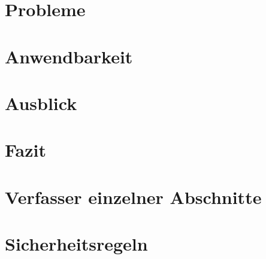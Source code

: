 \documentclass[11pt,a4paper]{article}
\begin{document}
\clearpage
\section{Probleme}
\label{sec:probleme}



\clearpage
\section{Anwendbarkeit}
\label{sec:anwendbarkeit}



\clearpage
\section{Ausblick}
\label{sec:ausblick}



\clearpage
\section{Fazit}
\label{sec:fazit}



\clearpage
\appendix
\section{Verfasser einzelner Abschnitte}

\clearpage
\section{Sicherheitsregeln}

\clearpage

\end{document}
